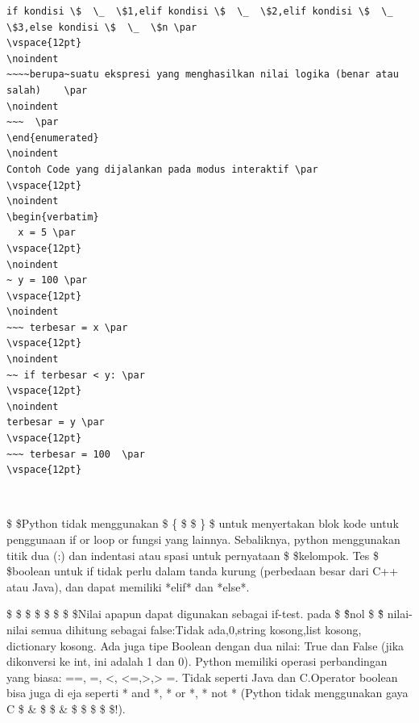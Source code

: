 \begin{verbatim}
if kondisi \$  \_  \$1,elif kondisi \$  \_  \$2,elif kondisi \$  \_  \$3,else kondisi \$  \_  \$n \par
\vspace{12pt}
\noindent 
~~~~berupa~suatu ekspresi yang menghasilkan nilai logika (benar atau salah)    \par
\noindent 
~~~  \par
\end{enumerated}
\noindent 
Contoh Code yang dijalankan pada modus interaktif \par
\vspace{12pt}
\noindent
\begin{verbatim}
  x = 5 \par
\vspace{12pt}
\noindent 
~ y = 100 \par
\vspace{12pt}
\noindent 
~~~ terbesar = x \par
\vspace{12pt}
\noindent 
~~ if terbesar < y: \par
\vspace{12pt}
\noindent 
terbesar = y \par
\vspace{12pt}
~~~ terbesar = 100  \par
\vspace{12pt}
\end{verbatim}
\noindent 
~~~  \par
\vspace{12pt}
\noindent 
 \$ \$Python tidak menggunakan \$ \{ \$ \$ \} \$ untuk menyertakan blok kode untuk penggunaan if or loop or fungsi yang lainnya. Sebaliknya, python menggunakan titik dua (:) dan indentasi atau spasi untuk pernyataan \$ \$kelompok. Tes \$ \$boolean untuk if tidak perlu dalam tanda kurung (perbedaan besar dari C++ atau Java), dan dapat memiliki *elif* dan *else*. \par
\noindent 
\vspace{\baselineskip}
 \$  \$ \$  \$ \$  \$ \$  \$Nilai apapun dapat digunakan sebagai if-test. pada  \$ \" \$nol \$ \" \$ nilai-nilai semua dihitung sebagai false:Tidak ada,0,string kosong,list kosong, dictionary kosong. Ada juga tipe Boolean dengan dua nilai: True dan False (jika dikonversi ke int, ini adalah 1 dan 0). Python memiliki operasi perbandingan yang biasa: ==, =, <, <=,>,> =. Tidak seperti Java dan C.Operator boolean bisa juga di eja seperti * and *, * or *, * not * (Python tidak menggunakan gaya C  \$  \&  \$  \$  \&  \$  \$  \vert  \$  \$  \vert  \$!). \par
